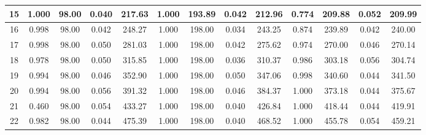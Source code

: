 \documentclass[12pt]{article}
\numberwithin{equation}{section}
\numberwithin{table}{section}
\numberwithin{thm}{section}
\numberwithin{defn}{section}
\numberwithin{lem}{section}
\numberwithin{prop}{section}
\numberwithin{cor}{section}
\numberwithin{rem}{section}
\begin{document}
\begin{sidewaystable}[htbp]
\begin{tabular}{|c|cccc|cccc|cccc|}
15 & \multicolumn{1}{c|}{1.000} & \multicolumn{1}{c|}{98.00} & \multicolumn{1}{c|}{0.040} & 217.63 & \multicolumn{1}{c|}{1.000} & \multicolumn{1}{c|}{193.89} & \multicolumn{1}{c|}{0.042} & 212.96 & \multicolumn{1}{c|}{0.774} & \multicolumn{1}{c|}{209.88} & \multicolumn{1}{c|}{0.052} & 209.99 \\ \hline
16 & \multicolumn{1}{c|}{0.998} & \multicolumn{1}{c|}{98.00} & \multicolumn{1}{c|}{0.042} & 248.27 & \multicolumn{1}{c|}{1.000} & \multicolumn{1}{c|}{198.00} & \multicolumn{1}{c|}{0.034} & 243.25 & \multicolumn{1}{c|}{0.874} & \multicolumn{1}{c|}{239.89} & \multicolumn{1}{c|}{0.042} & 240.00 \\ \hline
17 & \multicolumn{1}{c|}{0.998} & \multicolumn{1}{c|}{98.00} & \multicolumn{1}{c|}{0.050} & 281.03 & \multicolumn{1}{c|}{1.000} & \multicolumn{1}{c|}{198.00} & \multicolumn{1}{c|}{0.042} & 275.62 & \multicolumn{1}{c|}{0.974} & \multicolumn{1}{c|}{270.00} & \multicolumn{1}{c|}{0.046} & 270.14 \\ \hline
18 & \multicolumn{1}{c|}{0.978} & \multicolumn{1}{c|}{98.00} & \multicolumn{1}{c|}{0.050} & 315.85 & \multicolumn{1}{c|}{1.000} & \multicolumn{1}{c|}{198.00} & \multicolumn{1}{c|}{0.036} & 310.37 & \multicolumn{1}{c|}{0.986} & \multicolumn{1}{c|}{303.18} & \multicolumn{1}{c|}{0.056} & 304.74 \\ \hline
19 & \multicolumn{1}{c|}{0.994} & \multicolumn{1}{c|}{98.00} & \multicolumn{1}{c|}{0.046} & 352.90 & \multicolumn{1}{c|}{1.000} & \multicolumn{1}{c|}{198.00} & \multicolumn{1}{c|}{0.050} & 347.06 & \multicolumn{1}{c|}{0.998} & \multicolumn{1}{c|}{340.60} & \multicolumn{1}{c|}{0.044} & 341.50 \\ \hline
20 & \multicolumn{1}{c|}{0.994} & \multicolumn{1}{c|}{98.00} & \multicolumn{1}{c|}{0.056} & 391.32 & \multicolumn{1}{c|}{1.000} & \multicolumn{1}{c|}{198.00} & \multicolumn{1}{c|}{0.046} & 384.37 & \multicolumn{1}{c|}{1.000} & \multicolumn{1}{c|}{373.18} & \multicolumn{1}{c|}{0.044} & 375.67 \\ \hline
21 & \multicolumn{1}{c|}{0.460} & \multicolumn{1}{c|}{98.00} & \multicolumn{1}{c|}{0.054} & 433.27 & \multicolumn{1}{c|}{1.000} & \multicolumn{1}{c|}{198.00} & \multicolumn{1}{c|}{0.040} & 426.84 & \multicolumn{1}{c|}{1.000} & \multicolumn{1}{c|}{418.44} & \multicolumn{1}{c|}{0.044} & 419.91 \\ \hline
22 & \multicolumn{1}{c|}{0.982} & \multicolumn{1}{c|}{98.00} & \multicolumn{1}{c|}{0.044} & 475.39 & \multicolumn{1}{c|}{1.000} & \multicolumn{1}{c|}{198.00} & \multicolumn{1}{c|}{0.040} & 468.52 & \multicolumn{1}{c|}{1.000} & \multicolumn{1}{c|}{455.78} & \multicolumn{1}{c|}{0.054} & 459.21 \\ \hline

\end{tabular}
\end{sidewaystable}
\end{document}

